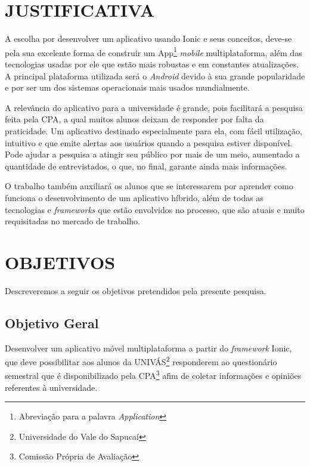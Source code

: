 \chapter{JUSTIFICATIVA}

	\par A escolha por desenvolver um aplicativo usando Ionic e seus conceitos, deve-se pela sua excelente forma de construir um App\footnote{Abreviação para a palavra \textit{Application}} \textit{mobile} multiplataforma, além das tecnologias usadas por ele que estão mais robustas e em constantes atualizações. A principal plataforma utilizada será o \textit{Android} devido à sua grande popularidade e por ser um dos sistemas operacionais mais usados mundialmente.
	
	\par A relevância do aplicativo para a universidade é grande, pois facilitará a pesquisa feita pela CPA, a qual muitos alunos deixam de responder por falta da praticidade. Um aplicativo destinado especialmente para ela, com fácil utilização, intuitivo e que emite alertas aos usuários quando a pesquisa estiver disponível. Pode ajudar a pesquisa a atingir seu público por mais de um meio, aumentado a quantidade de entrevistados, o que, no final, garante ainda mais informações.
	
	\par O trabalho também auxiliará os alunos que se interessarem por aprender como funciona o desenvolvimento de um aplicativo híbrido, além de todas as tecnologias e \textit{frameworks} que estão envolvidos no processo, que são atuais e muito requisitadas no mercado de trabalho.
	

\chapter{OBJETIVOS}

	\par Descreveremos a seguir os objetivos pretendidos pela presente pesquisa.

\section{Objetivo Geral}

	\par Desenvolver um aplicativo móvel multiplataforma a partir do \textit{framework} Ionic, que deve possibilitar aos alunos da UNIVÁS\footnote{Universidade do Vale do Sapucaí} responderem ao questionário semestral que é disponibilizado pela CPA\footnote{Comissão Própria de Avaliação} afim de coletar informações e opiniões referentes à universidade.

